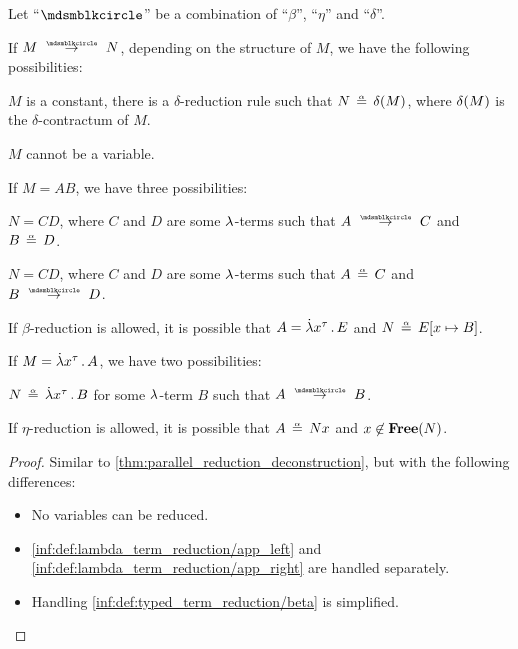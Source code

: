 \begin{lemma}\label{thm:single_step_reduction_deconstruction}
  Let \enquote{\( {\Anon} \)} be a combination of \enquote{\( \beta \)}, \enquote{\( \eta \)} and \enquote{\( \delta \)}.

  If \( M \pred N \), depending on the structure of \( M \), we have the following possibilities:
  \begin{thmenum}
     \( M \) is a constant, there is a \( \delta \)-reduction rule such that \( N \aequiv \op*{\delta}(M) \), where \( \op*{\delta}(M) \) is the \( \delta \)-contractum of \( M \).

     \( M \) cannot be a variable.

     If \( M = AB \), we have three possibilities:
    \begin{thmenum}
       \( N = CD \), where \( C \) and \( D \) are some \( {\mathrm \lambda} \)-terms such that \( A \pred C \) and \( B \aequiv D \).

       \( N = CD \), where \( C \) and \( D \) are some \( {\mathrm \lambda} \)-terms such that \( A \aequiv C \) and \( B \pred D \).

       If \( \beta \)-reduction is allowed, it is possible that \( A = \qabs {x^\tau} E \) and \( N \aequiv E[x \mapsto B] \).
    \end{thmenum}

     If \( M = \qabs {x^\tau} A \), we have two possibilities:
    \begin{thmenum}
       \( N \aequiv \qabs {x^\tau} B \) for some \( {\mathrm \lambda} \)-term \( B \) such that \( A \pred B \).

       If \( \eta \)-reduction is allowed, it is possible that \( A \aequiv Nx \) and \( x \not\in \op*{Free}(N) \).
    \end{thmenum}
  \end{thmenum}
\end{lemma}
\begin{proof}
  Similar to \cref{thm:parallel_reduction_deconstruction}, but with the following differences:
  \begin{itemize}
    \item No variables can be reduced.
    \item \ref{inf:def:lambda_term_reduction/app_left} and \ref{inf:def:lambda_term_reduction/app_right} are handled separately.
    \item Handling \ref{inf:def:typed_term_reduction/beta} is simplified.
  \end{itemize}
\end{proof}

